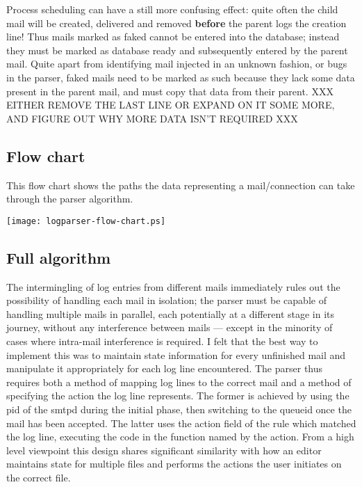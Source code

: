 \documentclass[a4paper,12pt,draft]{article}
\begin{document}
\begin{enumerate}
        Process scheduling can have a still more confusing effect: quite
        often the child mail will be created, delivered and removed
        \textbf{before} the parent logs the creation line!  Thus mails
        marked as faked cannot be entered into the database; instead they
        must be marked as database ready and subsequently entered by the
        parent mail.  Quite apart from identifying mail injected in an
        unknown fashion, or bugs in the parser, faked mails need to be
        marked as such because they lack some data present in the parent
        mail, and must copy that data from their parent.  XXX EITHER REMOVE
        THE LAST LINE OR EXPAND ON IT SOME MORE, AND FIGURE OUT WHY MORE
        DATA ISN'T REQUIRED XXX


\end{enumerate}

\subsection{Flow chart}

\label{flow-chart}

This flow chart shows the paths the data representing a mail/connection can
take through the parser algorithm.

\texttt{[image: logparser-flow-chart.ps]}

\subsection{Full algorithm}

\label{full-algorithm}

The intermingling of log entries from different mails immediately rules out
the possibility of handling each mail in isolation; the parser must be
capable of handling multiple mails in parallel, each potentially at a
different stage in its journey, without any interference between mails ---
except in the minority of cases where intra-mail interference is required.
I felt that the best way to implement this was to maintain state
information for every unfinished mail and manipulate it appropriately for
each log line encountered.  The parser thus requires both a method of
mapping log lines to the correct mail and a method of specifying the action
the log line represents.  The former is achieved by using the pid of the
smtpd during the initial phase, then switching to the queueid once the mail
has been accepted.  The latter uses the action field of the rule which
matched the log line, executing the code in the function named by the
action.  From a high level viewpoint this design shares significant
similarity with how an editor maintains state for multiple files and
performs the actions the user initiates on the correct file.
\end{document}
